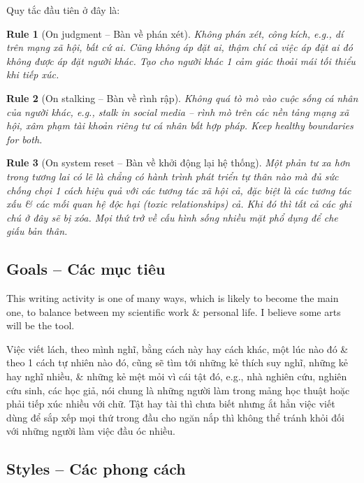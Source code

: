 \documentclass[12pt]{article}
\newtheorem{Rule}{Rule}
\begin{document}
Quy tắc đầu tiên ở đây là:
\begin{Rule}[On judgment -- Bàn về phán xét]
	Không phán xét, công kích, e.g., dí trên mạng xã hội, bất cứ ai. Cũng không áp đặt ai, thậm chí cả việc áp đặt ai đó không được áp đặt người khác. Tạo cho người khác 1 cảm giác thoải mái tối thiểu khi tiếp xúc.
\end{Rule}

\begin{Rule}[On stalking -- Bàn về rình rập]
	Không quá tò mò vào cuộc sống cá nhân của người khác, e.g., stalk in social media -- rình mò trên các nền tảng mạng xã hội, xâm phạm tài khoản  riêng tư cá nhân bất hợp pháp. Keep healthy boundaries for both.
\end{Rule}

\begin{Rule}[On system reset -- Bàn về khởi động lại hệ thống]
	Một phản tư xa hơn trong tương lai có lẽ là chẳng có hành trình phát triển tự thân nào mà đủ sức chống chọi 1 cách hiệu quả với các tương tác xã hội cả, đặc biệt là các tương tác xấu \& các mối quan hệ độc hại (toxic relationships) cả. Khi đó thì tất cả các ghi chú ở đây sẽ bị xóa. Mọi thứ trở về cấu hình sống nhiều mặt phổ dụng để che giấu bản thân.
\end{Rule} 

\subsection{Goals -- Các mục tiêu}
This writing activity is one of many ways, which is likely to become the main one, to balance between my scientific work \& personal life. I believe some arts will be the tool.

Việc viết lách, theo mình nghĩ, bằng cách này hay cách khác, một lúc nào đó \& theo 1 cách tự nhiên nào đó, cũng sẽ tìm tới những kẻ thích suy nghĩ, những kẻ hay nghĩ nhiều, \& những kẻ mệt mỏi vì cái tật đó, e.g., nhà nghiên cứu, nghiên cứu sinh, các học giả, nói chung là những người làm trong mảng học thuật hoặc phải tiếp xúc nhiều với chữ. Tật hay tài thì chưa biết nhưng ắt hẳn việc viết dùng để sắp xếp mọi thứ trong đầu cho ngăn nắp thì không thể tránh khỏi đối với những người làm việc đầu óc nhiều.

\subsection{Styles -- Các phong cách}
\end{document}

